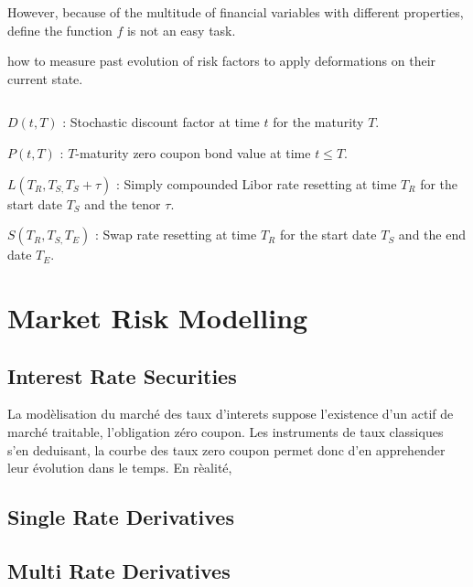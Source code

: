 \documentclass[3pt]{article}
\begin{document}
\bigskip

However, because of the multitude of financial variables with different
properties, define the function $f$ is not an easy task.

\bigskip

how to measure past evolution of risk factors to apply deformations on their
current state.

$\ \ \ \ \ $

\bigskip 

\bigskip 

\bigskip 

\bigskip 

$D(t,T)$ : Stochastic discount factor at time $t$ for the maturity $T$.

\bigskip

$P(t,T)$ : $T$-maturity zero coupon bond value at time $t\leq T$.

\bigskip

$L(T_{R},T_{S,}T_{S}+\tau )$ : Simply compounded Libor rate resetting at
time $T_{R}$ for the start date $T_{S}$ and the tenor $\tau $.

\bigskip

$S(T_{R},T_{S,}T_{E})$ : Swap rate resetting at time $T_{R}$ for the start
date $T_{S}$ and the end date $T_{E}$.

\bigskip

\section{Market Risk Modelling}

\subsection{Interest Rate Securities}

\bigskip La mod\`{e}lisation du march\'{e} des taux d'interets suppose
l'existence d'un actif de march\'{e} traitable, l'obligation z\'{e}ro
coupon. Les instruments de taux classiques s'en deduisant, la courbe des
taux zero coupon permet donc d'en apprehender leur \'{e}volution dans le
temps. En r\`{e}alit\'{e},

\bigskip

\subsection{Single Rate Derivatives}

\subsection{Multi Rate Derivatives}
\end{document}
